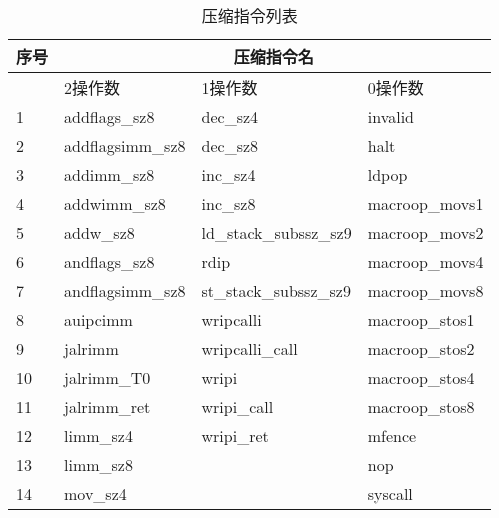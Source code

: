 \begin{table}[]
    \centering
    \caption{压缩指令列表}
    \label{app:compact_insts}
    \begin{tabular}{|l|l|l|l|}
    \hline
    \multicolumn{1}{|l|}{序号} & \multicolumn{3}{c|}{压缩指令名}                                                        \\ \hline
    \multicolumn{1}{|l|}{}    & \multicolumn{1}{l|}{2操作数} & \multicolumn{1}{l|}{1操作数} & \multicolumn{1}{l|}{0操作数} \\ \hline
    1                        & addflags\_sz8             & dec\_sz4                  & invalid                   \\
    2                        & addflagsimm\_sz8          & dec\_sz8                  & halt                      \\
    3                        & addimm\_sz8               & inc\_sz4                  & ldpop                     \\
    4                        & addwimm\_sz8              & inc\_sz8                  & macroop\_movs1            \\
    5                        & addw\_sz8                 & ld\_stack\_subssz\_sz9    & macroop\_movs2            \\
    6                        & andflags\_sz8             & rdip                      & macroop\_movs4            \\
    7                        & andflagsimm\_sz8          & st\_stack\_subssz\_sz9    & macroop\_movs8            \\
    8                        & auipcimm                  & wripcalli                 & macroop\_stos1            \\
    9                        & jalrimm                   & wripcalli\_call           & macroop\_stos2            \\
    10                       & jalrimm\_T0               & wripi                     & macroop\_stos4            \\
    11                       & jalrimm\_ret              & wripi\_call               & macroop\_stos8            \\
    12                       & limm\_sz4                 & wripi\_ret                & mfence                    \\
    13                       & limm\_sz8                 &                           & nop                       \\
    14                       & mov\_sz4                  &                           & syscall                   \\

\end{tabular}
\end{table}
